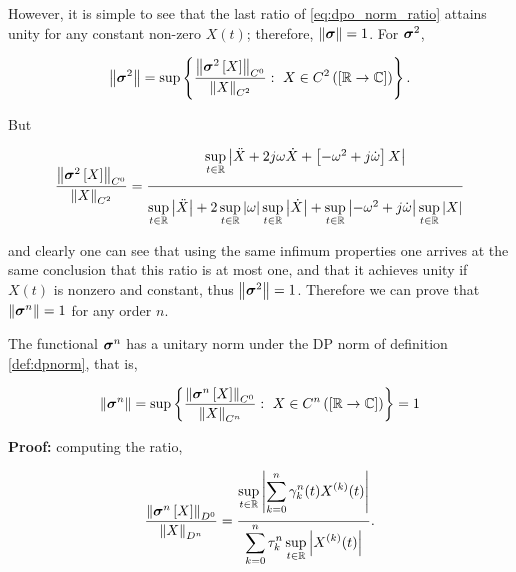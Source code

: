 	However, it is simple to see that the last ratio of \eqref{eq:dpo_norm_ratio} attains unity for any constant non-zero $X(t)$; therefore, $\left\lVert \boldsymbol{\sigma}\right\rVert = 1$. For $\boldsymbol{\sigma}^{2}$, 

\begin{equation} \left\lVert \boldsymbol{\sigma}^{2}\right\rVert = \sup\left\{ \dfrac{\left\lVert \boldsymbol{\sigma}^{2}\left[X\right]\right\rVert_{C^0}}{\left\lVert X\right\rVert_{C^2}}:\ X\in C^2\left(\left[\mathbb{R}\to\mathbb{C}\right]\right)\right\} .\end{equation}

	But

\begin{equation} \dfrac{\left\lVert \ndpo{2}\left[X\right]\right\rVert_{C^0}}{\left\lVert X\right\rVert_{C^2}} = \xfrac{5mm}{3mm}{\sup\limits_{t\in\mathbb{R}}\left\lvert \ddot{X} + 2j\omega \dot{X} + \left[-\omega^2 + j\dot{\omega}\right]X \right\rvert}{ \sup\limits_{t\in\mathbb{R}}\left\lvert \ddot{X} \right\rvert + 2\sup\limits_{t\in\mathbb{R}}\left\lvert \omega \right\rvert \sup\limits_{t\in\mathbb{R}}\left\lvert \dot{X} \right\rvert + \sup\limits_{t\in\mathbb{R}} \left\lvert -\omega^2 + j\dot{\omega}\right\rvert \sup\limits_{t\in\mathbb{R}}\left\lvert X\right\rvert } \end{equation}

	\noindent and clearly one can see that using the same infimum properties one arrives at the same conclusion that this ratio is at most one, and that it achieves unity if $X(t)$ is nonzero and constant, thus $\left\lVert\boldsymbol{\sigma}^{2}\right\rVert = 1$. Therefore we can prove that $\left\lVert\boldsymbol{\sigma}^{n}\right\rVert = 1$ for any order $n$.

\begin{theorem}\label{theo:dpfs_unitary} %
	The functional $\boldsymbol{\sigma}^{n}$ has a unitary norm under the DP norm of definition \ref{def:dpnorm}, that is,

\begin{equation} \left\lVert \boldsymbol{\sigma}^{n}\right\rVert = \sup\left\{ \dfrac{\left\lVert \boldsymbol{\sigma}^{n}\left[X\right]\right\rVert_{C^0}}{\left\lVert X\right\rVert_{C^n}}:\ X\in C^n\left(\left[\mathbb{R}\to\mathbb{C}\right]\right)\right\} = 1 \end{equation}
\end{theorem}
\textbf{Proof:} computing the ratio,

\begin{equation} \dfrac{\left\lVert \ndpo{n}\left[X\right]\right\rVert_{D^0}}{\left\lVert X\right\rVert_{D^n}} = \xfrac{5mm}{3mm}{\displaystyle \sup\limits_{t\in\mathbb{R}}\left\lvert\sum\limits_{k=0}^n \gamma_k^n (t)X^{(k)}(t)\right\rvert }{\displaystyle \sum\limits_{k=0}^n \tau_k^n \sup\limits_{t\in\mathbb{R}}\left\lvert X^{(k)}(t)\right\rvert } .\end{equation}

